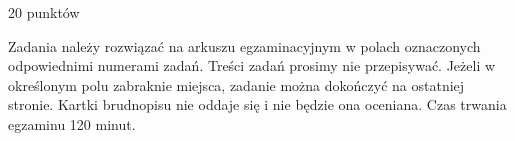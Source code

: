 \documentclass[10pt]{article}
\begin{document}
20 punktów

Zadania należy rozwiązać na arkuszu egzaminacyjnym w polach oznaczonych odpowiednimi numerami zadań. Treści zadań prosimy nie przepisywać. Jeżeli w określonym polu zabraknie miejsca, zadanie można dokończyć na ostatniej stronie. Kartki brudnopisu nie oddaje się i nie będzie ona oceniana. Czas trwania egzaminu 120 minut.
\end{document}
